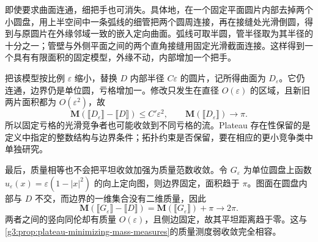 \ProseParagraphBreak
即使要求曲面连通，细把手也可消失。具体地，在一个固定平面圆片内部去掉两个小圆盘，用上半空间中一条弧线的细管把两个圆周连接，再在接缝处光滑倒圆，得到与原圆片在外缘邻域一致的嵌入定向曲面。弧线可取半圆，管半径取为其半径的十分之一；管壁与外侧平面之间的两个直角接缝用固定光滑截面连接。这样得到一个具有有限面积的固定模型，外缘不动，内部增加一个把手。

\ProseParagraphBreak
把该模型按比例 \(\varepsilon\) 缩小，替换 \(D\) 内部半径 \(C\varepsilon\) 的圆片，记所得曲面为 \(D_\varepsilon\)。它仍连通，边界仍是单位圆，亏格增加一。修改只发生在直径 \(O(\varepsilon)\) 的区域，且新旧两片面积都为 \(O(\varepsilon^2)\)，故
\[
	\mathbf M(\lBrack D_\varepsilon\rBrack-\lBrack D\rBrack)
	\le C'\varepsilon^2,\qquad
	\mathbf M(\lBrack D_\varepsilon\rBrack)\longrightarrow\pi.
\]
所以固定亏格的光滑竞争者也可能收敛到不同亏格的流。Plateau 存在性保留的是定义中指定的整数结构与边界条件；拓扑约束是否保留，要在相应的更小竞争类中单独研究。

\ProseParagraphBreak
最后，质量相等也不会把平坦收敛加强为质量范数收敛。令 \(G_\varepsilon\) 为单位圆盘上函数 \(u_\varepsilon(x)=\varepsilon(1-|x|^2)\) 的向上定向图，则边界固定，面积趋于 \(\pi\)。图面在圆盘内部与 \(D\) 不交，而边界的一维集合没有二维质量，因此
\[
	\mathbf M(\lBrack G_\varepsilon\rBrack-\lBrack D\rBrack)
	=\mathbf M(\lBrack G_\varepsilon\rBrack)+\pi\longrightarrow2\pi.
\]
两者之间的竖向同伦却有质量 \(O(\varepsilon)\)，且侧边固定，故其平坦距离趋于零。这与\cref{g3:prop:plateau-minimizing-mass-measures}的质量测度弱收敛完全相容。
